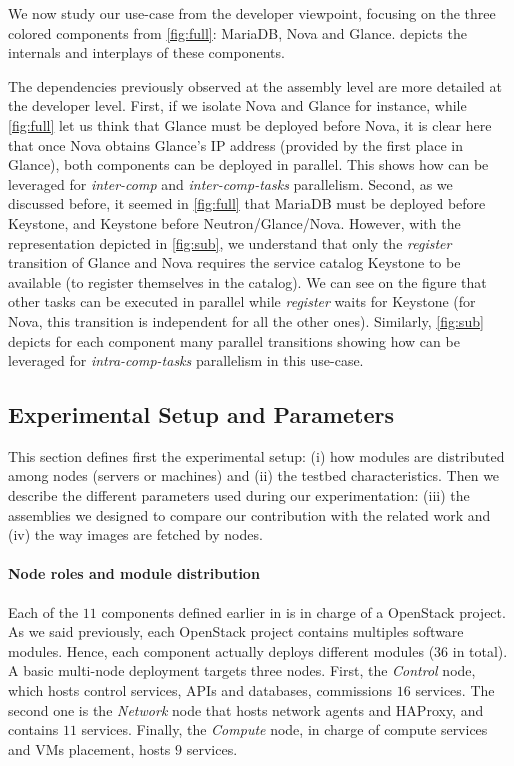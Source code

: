 We now study our use-case from the developer viewpoint, focusing on
the three colored components from \cref{fig:full}: MariaDB, Nova and
Glance.   depicts the internals and interplays of these
components.

The dependencies previously observed at the assembly level are more
detailed at the developer level. First, if we isolate Nova and Glance
for instance, while \cref{fig:full} let us think that Glance must be
deployed before Nova, it is clear here that once Nova obtains Glance's
IP address (provided by the first place in Glance), both components
can be deployed in parallel. This shows how \mad can be leveraged for
\emph{inter-comp} and \emph{inter-comp-tasks} parallelism.  Second, as we
discussed before, it seemed in \cref{fig:full} that MariaDB must be
deployed before Keystone, and Keystone before
Neutron/Glance/Nova. However, with the \mad representation depicted in
\cref{fig:sub}, we understand that only the \emph{register} transition
of Glance and Nova requires the service catalog Keystone to be
available (\ie to register themselves in the catalog). We can see on
the figure that other tasks can be executed in parallel while
\emph{register} waits for Keystone (\eg for Nova, this transition is
independent for all the other ones). Similarly, \cref{fig:sub} depicts
for each component many parallel transitions showing how \mad can be
leveraged for \emph{intra-comp-tasks} parallelism in this use-case.

\subsection{Experimental Setup and Parameters}

This section defines first the experimental setup: (i) how modules are
distributed among nodes (\ie servers or machines) and (ii) the testbed
characteristics. Then we describe the different parameters used during
our experimentation: (iii) the assemblies we designed to compare our
contribution with the related work and (iv) the way \docker images are
fetched by nodes.

\paragraph{Node roles and module distribution}
Each of the $11$ components defined earlier in \kolla is in charge of
a OpenStack project. As we said previously, each OpenStack project
contains multiples software modules. Hence, each component actually
deploys different modules ($36$ in total). A basic multi-node \kolla
deployment targets three nodes. First, the \emph{Control} node, which
hosts control services, APIs and databases, commissions $16$
services. The second one is the \emph{Network} node that hosts network
agents and HAProxy, and contains $11$ services. Finally, the
\emph{Compute} node, in charge of compute services and VMs placement,
hosts $9$ services.

